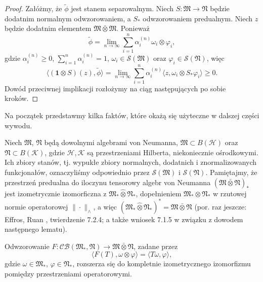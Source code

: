 \begin{proof}
Załóżmy, że $\tilde{\phi}$ jest stanem separowalnym.
Niech $S: \mathfrak{M} \rightarrow \mathfrak{N}$ będzie
dodatnim normalnym odwzorowaniem, a $S_*$ odwzorowaniem predualnym.
Niech $z$ będzie dodatnim elementem
$\mathfrak{M} \bar{\otimes} \mathfrak{M}$.
Ponieważ
\begin{equation}
    \tilde{\phi} =\lim \limits_{n \rightarrow \infty}
\sum_{i=1}^{n}\alpha_i^{(n)} \omega_{i} \otimes \varphi_{i},
\end{equation}
gdzie
$\alpha_i^{(n)}\geq 0$, $\sum_{i=1}^n\alpha_i^{(n)}=1$,
$\omega_{i}\in\mathcal{S}(\mathfrak{M})$
oraz
$\varphi_{i}\in\mathcal{S}(\mathfrak{N})$,
więc
\begin{equation}
 \langle (\mathbf{1} \otimes S)(z), \tilde{\phi} \rangle =
 \lim \limits_{n \rightarrow \infty}\sum \limits_{i = 1}^{n}\alpha_i^{(n)}
 \langle z, \omega_{i} \otimes S_{*} \varphi_{i} \rangle \geq 0.
\end{equation}
Dowód przeciwnej implikacji rozłożymy na ciąg następujących po sobie kroków.
\end{proof}

Na początek przedstawmy kilka faktów, które okażą się użyteczne w dalszej
części wywodu.

Niech  $\mathfrak{M}$, $\mathfrak{N}$
będą dowolnymi algebrami von Neumanna,
$\mathfrak{M}\subset B(\mathcal{H})$ oraz $\mathfrak{N}\subset B(\mathcal{K})$,
gdzie  $\mathcal{H},\mathcal{K}$
są przestrzeniami Hilberta, niekoniecznie ośrodkowymi.
Ich zbiory stanów, tj. wypukłe zbiory normalnych, dodatnich i znormalizowanych
funkcjonałów, oznaczyliśmy odpowiednio przez
$\mathcal{S}(\mathfrak{M})$ i $\mathcal{S}(\mathfrak{N})$.
Pamiętajmy, że przestrzeń predualna do iloczynu tensorowy algebr von Neumanna
$(\mathfrak{M} \bar{\otimes} \mathfrak{N})_{*}$
jest izometrycznie izomorficzna z
$\mathfrak{M}_*\hat{\otimes}\mathfrak{N}_*$, dopełnieniem
$\mathfrak{M}_*\otimes\mathfrak{N}_*$ w rzutowej normie operatorowej
\label{def:projectiveoperatornorm}
$\|\cdot\|_\wedge$,
a więc $(\mathfrak{M}_*\hat{\otimes}\mathfrak{N}_*)^*= \mathfrak{M} \bar{\otimes} \mathfrak{N}$
(por. raz jeszcze: Effros, Ruan \cite{Effros2000}, twierdzenie 7.2.4;
a także wniosek 7.1.5 w związku z dowodem następnego lematu).
\begin{Lemma}
\label{thm:isometry}
Odwzorowanie $F: \mathcal{CB}(\mathfrak{M}_{*}, \mathfrak{N})
\rightarrow \mathfrak{M} \bar{\otimes} \mathfrak{N}$,
zadane przez
\begin{equation}
\langle F(T), \omega \otimes \varphi \rangle =\langle T\omega, \varphi \rangle,
\end{equation}
gdzie $\omega \in \mathfrak{M}_{*}$, $\varphi \in \mathfrak{N}_{*}$,
rozszerza się do kompletnie izometrycznego izomorfizmu pomiędzy przestrzeniami
operatorowymi.
\end{Lemma}

